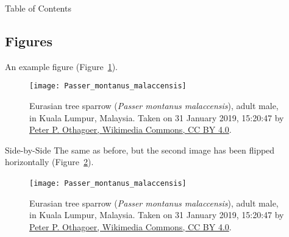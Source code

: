 \documentclass[aspectratio=169,xcolor={svgnames}]{beamer}
\begin{document}
\begin{frame}{Table of Contents}
  \tableofcontents[currentsection]
\end{frame}

\subsection{Figures}
\begin{frame}{\insertsubsectionhead}
  An example figure (Figure~\ref{fig:sparrow}).

  \begin{figure}
    \centering
    \texttt{[image: Passer\_montanus\_malaccensis]}
    \caption{
      Eurasian tree sparrow (\textit{Passer montanus malaccensis}), adult
      male, in Kuala Lumpur, Malaysia. Taken on 31 January 2019, 15:20:47 by
      \href{
        https://commons.wikimedia.org/wiki/File:Passer_montanus_malaccensis_@_Kuala_Lumpur,_Malaysia_(1).jpg
      }{Peter P. Othagoer, Wikimedia Commons, CC BY 4.0}. \label{fig:sparrow}
    }
  \end{figure}
\end{frame}

\begin{frame}{\insertsubsectionhead}{Side-by-Side}
  The same as before, but the second image has been flipped horizontally
  (Figure~\ref{fig:sparrow2}).

  \begin{figure}
    \centering
    \texttt{[image: Passer\_montanus\_malaccensis]}
    ~~~
    \caption{Eurasian tree sparrow (\textit{Passer montanus malaccensis}),
      adult male, in Kuala Lumpur, Malaysia. Taken on 31 January 2019,
      15:20:47 by \href{
        https://commons.wikimedia.org/wiki/File:Passer_montanus_malaccensis_@_Kuala_Lumpur,_Malaysia_(1).jpg
      }{Peter P. Othagoer, Wikimedia Commons, CC BY 4.0}. \label{fig:sparrow2}
    }
  \end{figure}
\end{frame}

\end{document}
